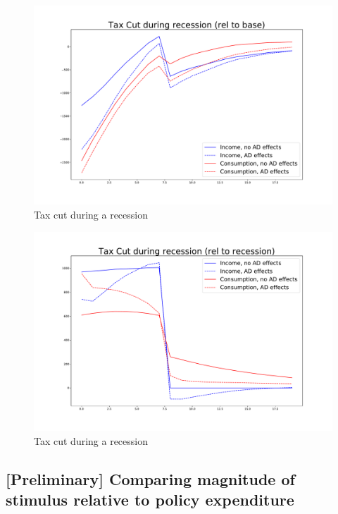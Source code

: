 \documentclass[]{article}
\begin{document}
\begin{figure} 
	\begin{centering}
		\includegraphics[width=\linewidth]{../taxcut_recession.pdf}
		\caption{Tax cut during a recession}
		\label{fig:taxcutrecession}
	\end{centering}
\end{figure}
\begin{figure} 
	\begin{centering}
		\includegraphics[width=\linewidth]{../taxcut_recession2.pdf}
		\caption{Tax cut during a recession}
		\label{fig:taxcutrecession2}
	\end{centering}
\end{figure}

\FloatBarrier
\subsection{[Preliminary] Comparing magnitude of stimulus relative to policy expenditure}
\end{document}

